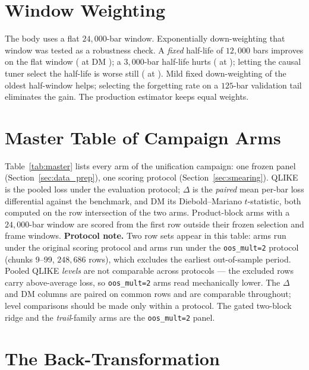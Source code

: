 \appendix

\section{Window Weighting}
\label{sec:dense_weak_ew}

The body uses a flat $24{,}000$-bar window. Exponentially
down-weighting that window was tested as a robustness check. A
\emph{fixed} half-life of $12{,}000$ bars improves on the flat window
(\unifIncrBlkThreeEwFixedHTwelveKDQ{} at DM
\unifIncrBlkThreeEwFixedHTwelveKDM{}); a $3{,}000$-bar half-life hurts
(\unifIncrBlkThreeEwFixedHThreeKDQ{} at
\unifIncrBlkThreeEwFixedHThreeKDM{}); letting the causal tuner select
the half-life is worse still (\unifIncrBlkThreeEwTunedDQ{} at
\unifIncrBlkThreeEwTunedDM{}). Mild fixed down-weighting of the oldest
half-window helps; selecting the forgetting rate on a $125$-bar
validation tail eliminates the gain. The production estimator keeps
equal weights.

\section{Master Table of Campaign Arms}
\label{sec:appendix_master}

Table~\ref{tab:master} lists every arm of the unification campaign: one
frozen panel (Section~\ref{sec:data_prep}), one scoring protocol
(Section~\ref{sec:smearing}). QLIKE is the pooled loss under the evaluation protocol;
$\Delta$ is the \emph{paired} mean per-bar loss differential against the
benchmark, and DM its Diebold--Mariano $t$-statistic, both computed on the
row intersection of the two arms. Product-block arms
with a $24{,}000$-bar window are scored from the first row outside their
frozen selection and frame windows. \textbf{Protocol note.} Two row sets
appear in this table: arms run under the original scoring protocol and
arms run under the \texttt{oos\_mult=2} protocol (chunks 9--99,
$248{,}686$ rows), which excludes the earliest out-of-sample period.
Pooled QLIKE \emph{levels} are not comparable across protocols --- the
excluded rows carry above-average loss, so \texttt{oos\_mult=2} arms
read mechanically lower. The $\Delta$ and DM columns are paired on
common rows and are comparable throughout; level comparisons should be
made only within a protocol. The gated two-block ridge and the
\emph{trail}-family arms are the \texttt{oos\_mult=2} panel.
\section{The Back-Transformation}
\label{sec:appendix_backtransform}


